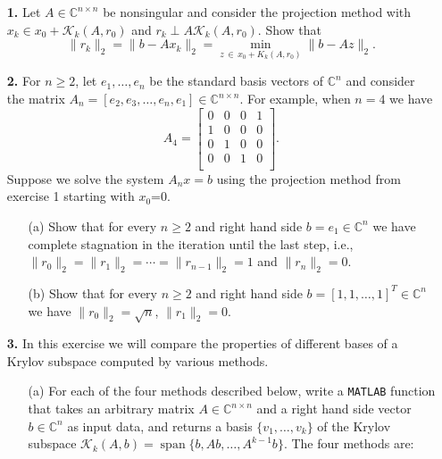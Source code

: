 \documentclass[10pt]{report}
\begin{document}
\begin{enumerate}
\item[\textbf{1.}] Let $A \in \mathbb{C}^{n \times n}$ be nonsingular and consider the projection method with $x_k \in x_0 + \mathcal{K}_k(A,r_0)$ and \linebreak $r_k \perp A \mathcal{K}_k(A,r_0)$. Show that \[\|r_{k}\|_2=\|b-Ax_k\|_2=\min_{z \,\in \, x_0+K_k(A,r_0)}\|b-Az\|_2.\]


\vspace{0.1cm} 

\item[\textbf{2.}] For $n \geq 2$, let  $e_1, \ldots, e_n$ be the standard basis vectors of $\mathbb{C}^n$ and consider the matrix 
$A_n=[e_2,e_3,\ldots ,e_n,e_1] \in \mathbb{C}^{n \times n}$. For example, when $n=4$ we have
\[  A_4 = \left[\begin{array}{cccc}
0 & 0 & 0 & 1 \\ 
1 & 0 & 0 & 0 \\
0 & 1 & 0 & 0 \\
0 & 0 & 1 & 0 \\
\end{array} \right].\]
Suppose we solve the system $A_nx=b$ using the projection method from exercise 1 starting with $x_0$=0.
\begin{itemize}
\item[(a)] Show that for every $n \geq 2$ and right hand side $b=e_1 \in \mathbb{C}^n$ we have complete stagnation in the iteration until the last step, i.e., $\|r_0\|_2 = \|r_1\|_2=\cdots =\|r_{n-1}\|_2=1$ and $\|r_n\|_2=0$.
\item[(b)] Show that for every $n \geq 2$ and right hand side $b=[1, 1, \ldots, 1]^T \in \mathbb{C}^n$ we have $\|r_0\|_2=\sqrt{n}$, $\|r_1\|_2=0.$
\end{itemize}  

\item[\textbf{3.}] In this exercise we will compare the properties of different bases of a Krylov subspace computed by various methods.  

\begin{itemize}
\item[(a)]  For each of the four methods described below, write a \verb+MATLAB+ function that takes an arbitrary matrix $A \in \mathbb{C}^{n \times n}$ and a right hand side vector $b\in \mathbb{C}^n$ as input data, and returns a basis $\{v_1, \ldots, v_k\}$ of the Krylov subspace $\mathcal{K}_k(A,b)= \operatorname{span}\{b, Ab, \ldots, A^{k-1}b\}.$ The four methods are:


\end{itemize}
\end{enumerate}
\end{document}
